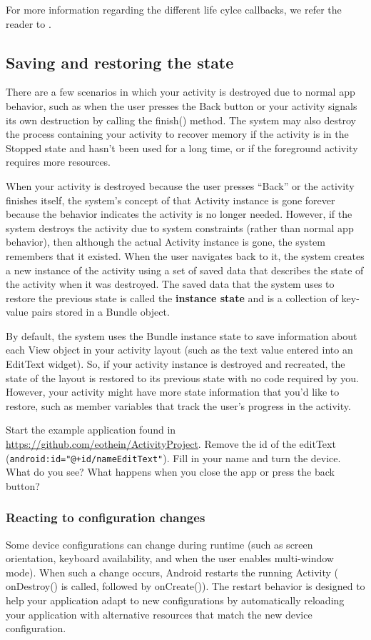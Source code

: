 For more information regarding the different life cylce callbacks, we refer the reader to \cite{Developers19}.

\subsection{Saving and restoring the state}
There are a few scenarios in which your activity is destroyed due to normal app behavior, such as when the user presses the Back button or your activity signals its own destruction by calling the finish() method.
The system may also destroy the process containing your activity to recover memory if the activity is in the Stopped state and hasn't been used for a long time, or if the foreground activity requires more resources.

When your activity is destroyed because the user presses  ``Back'' or the activity finishes itself, the system's concept of that Activity instance is gone forever because the behavior indicates the activity is no longer needed.
However, if the system destroys the activity due to system constraints (rather than normal app behavior), then although the actual Activity instance is gone, the system remembers that it existed.
When the user navigates back to it, the system creates a new instance of the activity using a set of saved data that describes the state of the activity when it was destroyed.
The saved data that the system uses to restore the previous state is called the \textbf{instance state} and is a collection of key-value pairs stored in a Bundle object.

By default, the system uses the Bundle instance state to save information about each View object in your activity layout (such as the text value entered into an EditText widget).
So, if your activity instance is destroyed and recreated, the state of the layout is restored to its previous state with no code required by you.
However, your activity might have more state information that you'd like to restore, such as member variables that track the user's progress in the activity.

\begin{exercise}
	Start the example application found in \url{https://github.com/eothein/ActivityProject}.
	Remove the id of the editText (\texttt{android:id="@+id/nameEditText"}).
	Fill in your name and turn the device.
	What do you see? What happens when you close the app or press the back button?
\end{exercise}

\subsubsection{Reacting to configuration changes}
Some device configurations can change during runtime (such as screen orientation, keyboard availability, and when the user enables multi-window mode).
When such a change occurs, Android restarts the running Activity ( onDestroy() is called, followed by onCreate()).
The restart behavior is designed to help your application adapt to new configurations by automatically reloading your application with alternative resources that match the new device configuration.

